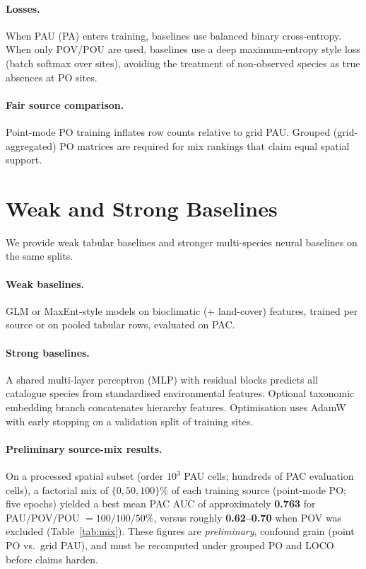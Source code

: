 \documentclass[11pt,letterpaper]{article}
\begin{document}
\paragraph{Losses.}
When PAU (PA) enters training, baselines use balanced binary cross-entropy.
When only POV/POU are used, baselines use a deep maximum-entropy style loss (batch softmax over sites), avoiding the treatment of non-observed species as true absences at PO sites.

\paragraph{Fair source comparison.}
Point-mode PO training inflates row counts relative to grid PAU.
Grouped (grid-aggregated) PO matrices are required for mix rankings that claim equal spatial support.


\section{Weak and Strong Baselines}
\label{sec:baselines}

We provide weak tabular baselines and stronger multi-species neural baselines on the same splits.

\paragraph{Weak baselines.}
GLM or MaxEnt-style models on bioclimatic (+ land-cover) features, trained per source or on pooled tabular rows, evaluated on PAC.

\paragraph{Strong baselines.}
A shared multi-layer perceptron (MLP) with residual blocks predicts all catalogue species from standardised environmental features.
Optional taxonomic embedding branch concatenates hierarchy features.
Optimisation uses AdamW with early stopping on a validation split of training sites.

\paragraph{Preliminary source-mix results.}
On a processed spatial subset (order $10^3$ PAU cells; hundreds of PAC evaluation cells), a factorial mix of $\{0,50,100\}\%$ of each training source (point-mode PO; five epochs) yielded a best mean PAC AUC of approximately \textbf{0.763} for PAU/POV/POU $=100/100/50\%$, versus roughly \textbf{0.62--0.70} when POV was excluded (Table~\ref{tab:mix}).
These figures are \emph{preliminary}, confound grain (point PO vs.\ grid PAU), and must be recomputed under grouped PO and LOCO before claims harden.
\end{document}
